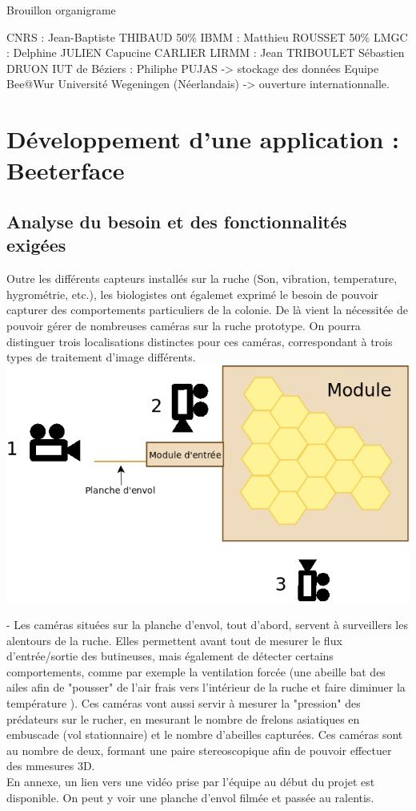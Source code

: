 \documentclass[11pt,french,a4paper]{report}
\begin{document}
Brouillon organigrame 

CNRS : Jean-Baptiste THIBAUD 50\%
IBMM : Matthieu ROUSSET 50\%
LMGC : Delphine JULIEN
       Capucine CARLIER
LIRMM : Jean TRIBOULET 
        Sébastien DRUON 
IUT de Béziers : Philiphe PUJAS -> stockage des données 
Equipe Bee@Wur Université Wegeningen (Néerlandais) -> ouverture internationnalle. 


\chapter{Développement d'une application : Beeterface}

    \section{Analyse du besoin et des fonctionnalités exigées}

Outre les différents capteurs installés sur la ruche (Son, vibration, temperature, hygrométrie, etc.), les biologistes ont égalemet exprimé le
besoin de pouvoir capturer des comportements particuliers de la colonie. De là vient la nécessitée de pouvoir gérer de nombreuses caméras sur la ruche
prototype. On pourra distinguer trois localisations distinctes pour ces caméras, correspondant à trois types de traitement d'image différents. \\

\includegraphics[scale=0.3]{../images/dia/schema_camera.png}


- Les caméras situées sur la planche d'envol, tout d'abord, servent à surveillers 
  les alentours de la ruche. Elles permettent avant tout de
  mesurer le flux d'entrée/sortie des butineuses, mais également de détecter
  certains comportements, comme par exemple la ventilation forcée (une abeille
  bat des ailes afin de "pousser" de l'air frais vers l'intérieur de la ruche et faire
  diminuer la température ). Ces caméras vont aussi servir à mesurer la
  "pression" des prédateurs sur le rucher, en mesurant le nombre de frelons
  asiatiques en embuscade (vol stationnaire) et le nombre d'abeilles
  capturées. Ces caméras sont au nombre de deux, formant une paire
  stereoscopique afin de pouvoir effectuer des mmesures 3D. \\
  En annexe, un lien vers une vidéo prise par l'équipe au début du projet est disponible. 
  On peut y voir une planche d'envol filmée et passée au ralentis. \\ 
\end{document}

